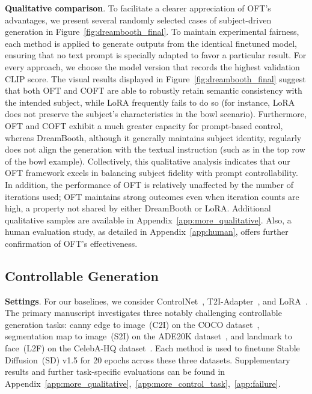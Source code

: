 \textbf{Qualitative comparison}. To facilitate a clearer appreciation of OFT's advantages, we present several randomly selected cases of subject-driven generation in Figure~\ref{fig:dreambooth_final}. To maintain experimental fairness, each method is applied to generate outputs from the identical finetuned model, ensuring that no text prompt is specially adapted to favor a particular result. For every approach, we choose the model version that records the highest validation CLIP score. The visual results displayed in Figure~\ref{fig:dreambooth_final} suggest that both OFT and COFT are able to robustly retain semantic consistency with the intended subject, while LoRA frequently fails to do so (for instance, LoRA does not preserve the subject’s characteristics in the bowl scenario). Furthermore, OFT and COFT exhibit a much greater capacity for prompt-based control, whereas DreamBooth, although it generally maintains subject identity, regularly does not align the generation with the textual instruction (such as in the top row of the bowl example). Collectively, this qualitative analysis indicates that our OFT framework excels in balancing subject fidelity with prompt controllability. In addition, the performance of OFT is relatively unaffected by the number of iterations used; OFT maintains strong outcomes even when iteration counts are high, a property not shared by either DreamBooth or LoRA. Additional qualitative samples are available in Appendix~\ref{app:more_qualitative}. Also, a human evaluation study, as detailed in Appendix~\ref{app:human}, offers further confirmation of OFT’s effectiveness.

\subsection{Controllable Generation}

\textbf{Settings}. For our baselines, we consider ControlNet~\cite{zhang2023adding}, T2I-Adapter~\cite{mou2023t2i}, and LoRA~\cite{hulora2022}. The primary manuscript investigates three notably challenging controllable generation tasks: canny edge to image~(C2I) on the COCO dataset~\cite{lin2014microsoft}, segmentation map to image~(S2I) on the ADE20K dataset~\cite{zhou2017scene}, and landmark to face~(L2F) on the CelebA-HQ dataset~\cite{karras2018progressive,xia2021tedigan}. Each method is used to finetune Stable Diffusion~(SD) v1.5 for 20 epochs across these three datasets. Supplementary results and further task-specific evaluations can be found in Appendix~\ref{app:more_qualitative},~\ref{app:more_control_task},~\ref{app:failure}.

